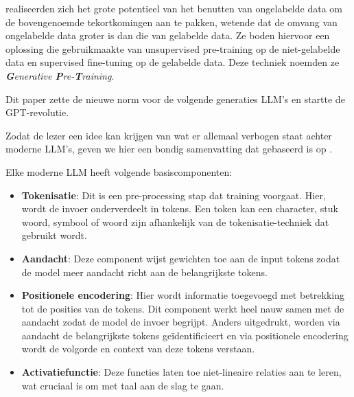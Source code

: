\textcite{Radford2018} realiseerden zich het grote potentieel van het benutten van ongelabelde data om de bovengenoemde tekortkomingen aan te pakken, wetende dat de omvang van ongelabelde data groter is dan die van gelabelde data. Ze boden hiervoor een oplossing die gebruikmaakte van unsupervised pre-training op de niet-gelabelde data en supervised fine-tuning op de gelabelde data. Deze techniek noemden ze \emph{\textbf{G}enerative \textbf{P}re-\textbf{T}raining}.

Dit paper zette de nieuwe norm voor de volgende generaties \acrshort{LLM}'s en startte de GPT-revolutie.
 
Zodat de lezer een idee kan krijgen van wat er allemaal verbogen staat achter moderne \acrshort{LLM}'s, geven we hier een bondig samenvatting dat gebaseerd is op \textcite{Naveed2023}.

Elke moderne \acrshort{LLM} heeft volgende basiscomponenten: 
\begin{itemize} 
    \item \textbf{Tokenisatie}: Dit is een pre-processing stap dat training voorgaat. Hier, wordt de invoer onderverdeelt in tokens. Een token kan een character, stuk woord, symbool of woord zijn afhankelijk van de tokenisatie-techniek dat gebruikt wordt.
    \item \textbf{Aandacht}: Deze component wijst gewichten toe aan de input tokens zodat de model meer aandacht richt aan de belangrijkste tokens.
    \item \textbf{Positionele encodering}: Hier wordt informatie toegevoegd met betrekking tot de posities van de tokens. Dit component werkt heel nauw samen met de aandacht zodat de model de invoer begrijpt. Anders uitgedrukt, worden via aandacht de belangrijkste tokens geïdentificieert en via positionele encodering wordt de volgorde en context van deze tokens verstaan.
    \item \textbf{Activatiefunctie}: Deze functies laten toe niet-lineaire relaties aan te leren, wat cruciaal is om met taal aan de slag te gaan.
\end{itemize}

